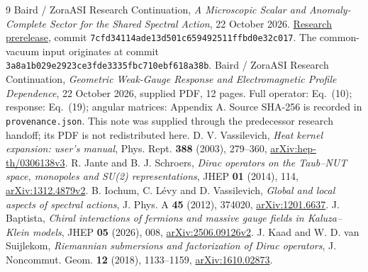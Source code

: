 \documentclass[11pt,letterpaper]{article}
\begin{document}
\clearpage
\begin{thebibliography}{9}\small
{} Baird / ZoraASI Research Continuation, \emph{A Microscopic Scalar and Anomaly-Complete Sector for the Shared Spectral Action}, 22 October 2026. \href{https://github.com/Cbaird26/mqgt-scf-continued/releases/tag/v2026.10.22-scalar-anomaly-sector}{Research prerelease}, commit \texttt{7cfd34114ade13d501c659492511ffbd0e32c017}. The common-vacuum input originates at commit \texttt{3a8a1b029e2923ce3fde3335fbc710ebf618a38b}.
 Baird / ZoraASI Research Continuation, \emph{Geometric Weak-Gauge Response and Electromagnetic Profile Dependence}, 22 October 2026, supplied PDF, 12 pages. Full operator: Eq.~(10); response: Eq.~(19); angular matrices: Appendix A. Source SHA-256 is recorded in \texttt{provenance.json}. This note was supplied through the predecessor research handoff; its PDF is not redistributed here.
 D. V. Vassilevich, \emph{Heat kernel expansion: user's manual}, Phys. Rept. \textbf{388} (2003), 279--360, \href{https://arxiv.org/abs/hep-th/0306138v3}{arXiv:hep-th/0306138v3}.
 R. Jante and B. J. Schroers, \emph{Dirac operators on the Taub--NUT space, monopoles and SU(2) representations}, JHEP \textbf{01} (2014), 114, \href{https://arxiv.org/abs/1312.4879v2}{arXiv:1312.4879v2}.
 B. Iochum, C. L\'evy and D. Vassilevich, \emph{Global and local aspects of spectral actions}, J. Phys. A \textbf{45} (2012), 374020, \href{https://arxiv.org/abs/1201.6637}{arXiv:1201.6637}.
 J. Baptista, \emph{Chiral interactions of fermions and massive gauge fields in Kaluza--Klein models}, JHEP \textbf{05} (2026), 008, \href{https://arxiv.org/abs/2506.09126v2}{arXiv:2506.09126v2}.
 J. Kaad and W. D. van Suijlekom, \emph{Riemannian submersions and factorization of Dirac operators}, J. Noncommut. Geom. \textbf{12} (2018), 1133--1159, \href{https://arxiv.org/abs/1610.02873}{arXiv:1610.02873}.
\end{thebibliography}
\end{document}
